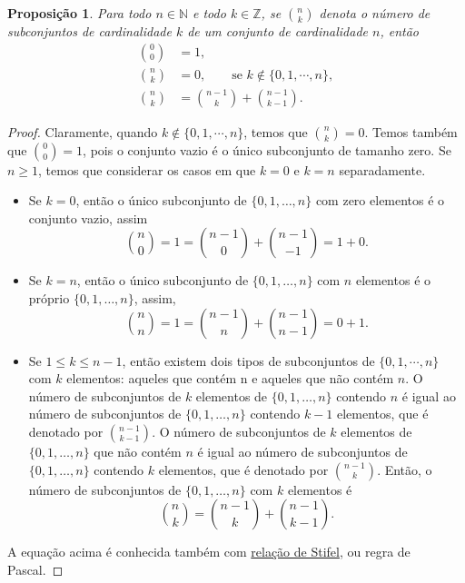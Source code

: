 \documentclass[]{book}
\newtheorem{proposition}{Proposição}[chapter]
\theoremstyle{definition}
\theoremstyle{definition}
\theoremstyle{definition}
\theoremstyle{remark}
\begin{document}
\begin{proposition}
\protect\hypertarget{prp:unnamed-chunk-44}{}{\label{prp:unnamed-chunk-44} }Para todo \(n \in \mathbb{N}\) e todo \(k \in \mathbb{Z}\), se \({n \choose k}\) denota o número de subconjuntos de cardinalidade \(k\) de um conjunto de cardinalidade \(n\), então
\begin{align}
{0 \choose 0} &= 1, \\
{n \choose k} &= 0, \qquad \text{se } k \notin \{0, 1, \cdots, n\},\\
{n \choose k} &= {n-1 \choose k} + {n-1 \choose k-1}.
\end{align}
\end{proposition}

\begin{proof}
\iffalse{} {Prova. } \fi{}Claramente, quando \(k \notin \{0, 1, \cdots, n\}\), temos que \({n \choose k} = 0\).
Temos também que \({0 \choose 0} = 1\), pois o conjunto vazio é o único subconjunto de tamanho zero.
Se \(n\geq 1\), temos que considerar os casos em que \(k=0\) e \(k=n\) separadamente.

\begin{itemize}
\item
  Se \(k=0\), então o único subconjunto de \(\{0, 1, \ldots, n\}\) com zero elementos é o conjunto vazio, assim
  \[ {n \choose 0} = 1 = {n-1 \choose 0} + {n-1 \choose -1} = 1+0.\]
\item
  Se \(k=n\), então o único subconjunto de \(\{0, 1, \ldots, n\}\) com \(n\) elementos é o próprio \(\{0, 1, \ldots, n\}\), assim,
  \[ {n \choose n} = 1 = {n-1 \choose n} + {n-1 \choose n-1} = 0+1.\]
\item
  Se \(1 \leq k \leq n-1\), então existem dois tipos de subconjuntos de \(\{0, 1, \cdots, n\}\) com \(k\) elementos: aqueles que contém n e aqueles que não contém \(n\).
  O número de subconjuntos de \(k\) elementos de \(\{0, 1, \ldots, n\}\) contendo \(n\) é igual ao número de subconjuntos de \(\{0, 1, \ldots, n\}\) contendo \(k-1\) elementos, que é denotado por \({n-1 \choose k-1}\).
  O número de subconjuntos de \(k\) elementos de \(\{0, 1, \ldots, n\}\) que não contém \(n\) é igual ao número de subconjuntos de \(\{0, 1, \ldots, n\}\) contendo \(k\) elementos, que é denotado por \({n-1 \choose k}\).
  Então, o número de subconjuntos de \(\{0, 1, \ldots, n\}\) com \(k\) elementos é
  \[ {n \choose k} = {n-1 \choose k} + {n-1 \choose k-1}.\]
\end{itemize}

A equação acima é conhecida também com \href{https://pt.wikipedia.org/wiki/Rela\%C3\%A7\%C3\%A3o_de_Stifel}{relação de Stifel}, ou regra de Pascal.
\end{proof}
\end{document}

